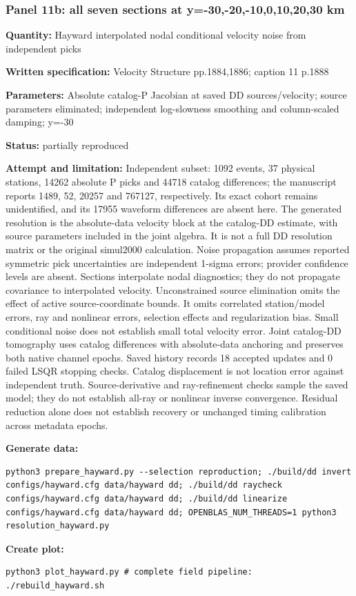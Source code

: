 \subsubsection*{Panel 11b: all seven sections at y=-30,-20,-10,0,10,20,30 km}
\noindent\textbf{Quantity:} Hayward interpolated nodal conditional velocity noise from independent picks\par
\noindent\textbf{Written specification:} Velocity Structure pp.1884,1886; caption 11 p.1888\par
\noindent\textbf{Parameters:} Absolute catalog-P Jacobian at saved DD sources/velocity; source parameters eliminated; independent log-slowness smoothing and column-scaled damping; y=-30\par
\noindent\textbf{Status:} partially reproduced\par
\noindent\textbf{Attempt and limitation:} Independent subset: 1092 events, 37 physical stations, 14262 absolute P picks and 44718 catalog differences; the manuscript reports 1489, 52, 20257 and 767127, respectively. Its exact cohort remains unidentified, and its 17955 waveform differences are absent here. The generated resolution is the absolute-data velocity block at the catalog-DD estimate, with source parameters included in the joint algebra. It is not a full DD resolution matrix or the original simul2000 calculation. Noise propagation assumes reported symmetric pick uncertainties are independent 1-sigma errors; provider confidence levels are absent. Sections interpolate nodal diagnostics; they do not propagate covariance to interpolated velocity. Unconstrained source elimination omits the effect of active source-coordinate bounds. It omits correlated station/model errors, ray and nonlinear errors, selection effects and regularization bias. Small conditional noise does not establish small total velocity error. Joint catalog-DD tomography uses catalog differences with absolute-data anchoring and preserves both native channel epochs. Saved history records 18 accepted updates and 0 failed LSQR stopping checks. Catalog displacement is not location error against independent truth. Source-derivative and ray-refinement checks sample the saved model; they do not establish all-ray or nonlinear inverse convergence. Residual reduction alone does not establish recovery or unchanged timing calibration across metadata epochs.\par
\noindent\textbf{Generate data:}
\begin{lstlisting}
python3 prepare_hayward.py --selection reproduction; ./build/dd invert configs/hayward.cfg data/hayward dd; ./build/dd raycheck configs/hayward.cfg data/hayward dd; ./build/dd linearize configs/hayward.cfg data/hayward dd; OPENBLAS_NUM_THREADS=1 python3 resolution_hayward.py
\end{lstlisting}
\noindent\textbf{Create plot:}
\begin{lstlisting}
python3 plot_hayward.py # complete field pipeline: ./rebuild_hayward.sh
\end{lstlisting}
